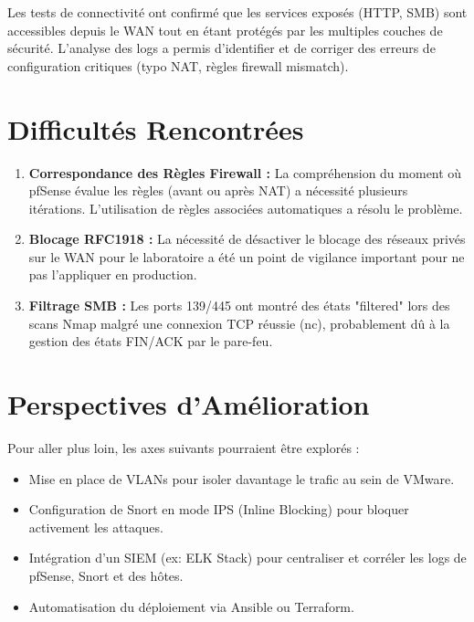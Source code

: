 \documentclass[12pt,a4paper,openany]{report}
\begin{document}
	Les tests de connectivité ont confirmé que les services exposés (HTTP, SMB) sont accessibles depuis le WAN tout en étant protégés par les multiples couches de sécurité. L'analyse des logs a permis d'identifier et de corriger des erreurs de configuration critiques (typo NAT, règles firewall mismatch).
	
	\section{Difficultés Rencontrées}
	\begin{enumerate}
		\item \textbf{Correspondance des Règles Firewall :} La compréhension du moment où pfSense évalue les règles (avant ou après NAT) a nécessité plusieurs itérations. L'utilisation de règles associées automatiques a résolu le problème.
		\item \textbf{Blocage RFC1918 :} La nécessité de désactiver le blocage des réseaux privés sur le WAN pour le laboratoire a été un point de vigilance important pour ne pas l'appliquer en production.
		\item \textbf{Filtrage SMB :} Les ports 139/445 ont montré des états "filtered" lors des scans Nmap malgré une connexion TCP réussie (nc), probablement dû à la gestion des états FIN/ACK par le pare-feu.
	\end{enumerate}
	
	\section{Perspectives d'Amélioration}
	Pour aller plus loin, les axes suivants pourraient être explorés :
	\begin{itemize}
		\item Mise en place de VLANs pour isoler davantage le trafic au sein de VMware.
		\item Configuration de Snort en mode IPS (Inline Blocking) pour bloquer activement les attaques.
		\item Intégration d'un SIEM (ex: ELK Stack) pour centraliser et corréler les logs de pfSense, Snort et des hôtes.
		\item Automatisation du déploiement via Ansible ou Terraform.
	\end{itemize}
	
\end{document}
